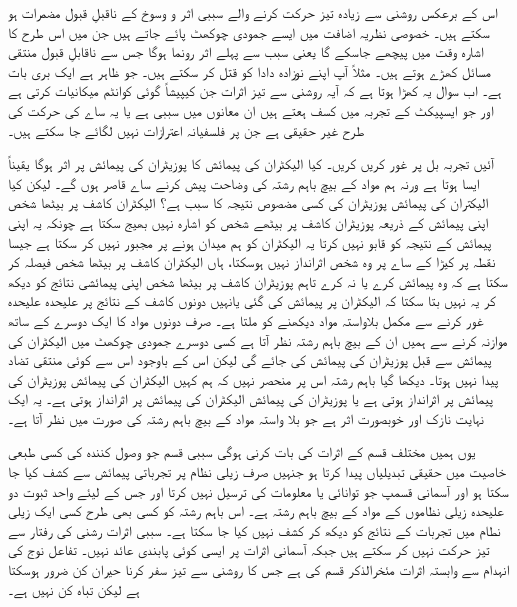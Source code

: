 
اس کے برعکس روشنی سے زیادہ تیز حرکت کرنے والے سببی اثر و وسوخ کے ناقبلِ قبول مضمرات ہو سکتے ہیں۔ خصوصی نظریہ اضافت میں ایسے جمودی چوکھٹ پائے جاتے ہیں جن میں اس طرح کا اشارہ وقت میں پیچھے جاسکے گا یعنی سبب سے پہلے اثر رونما ہوگا جس سے ناقابلِ قبول منتقی مسائل کھڑے ہوتے ہیں۔ مثلاً آپ اپنے نوزادہ دادا کو قتل کر سکتے ہیں۔ جو ظاہر ہے ایک بری بات ہے۔ اب سوال یہ کھڑا ہوتا ہے کہ آیہ روشنی سے تیز اثرات جن کیپیشاً گوئی کوانٹم میکانیات کرتی ہے اور جو ایسپیکٹ کے تجربہ میں کسف ہعتے ہیں ان معانوں میں سببی ہے یا یہ ساے کی حرکت کی طرح غیر حقیقی ہے جن پر فلسفیانہ اعترازات نہیں لگائے جا سکتے ہیں۔

آئیں تجربہ بل پر غور کریں کریں۔ کیا الیکٹران کی پیمائش کا پوزیٹران کی پیمائش پر اثر ہوگا  یقیناً ایسا ہوتا ہے ورنہ ہم مواد کے بیچ باہم رشتہ کی وضاحت پیش کرنے ساے قاصر ہوں گے۔ لیکن کیا الیکتران کی پیمائش پوزیٹران کی کسی مضصوص نتیجہ کا سبب ہے؟ الیکٹران کاشف پر بیٹھا شخص اپنی پیمائش کے ذریعہ پوزیٹران کاشف پر بیٹھے شخص کو اشارہ نہیں بھیج سکتا ہے چونکہ یہ اپنی پیمائش کے نتیجہ کو قابو نہیں کرتا یہ الیکٹران کو ہم میدان ہونے پر مجبور نہیں  کر سکتا ہے جیسا نقطہ  پر کیڑا کے ساے پر وہ شخص اثرانداز نہیں ہوسکتا، ہاں الیکٹران کاشف پر بیٹھا شخص فیصلہ کر سکتا ہے کہ وہ پیمائش کرے یا نہ کرے تاہم پوزیٹران کاشف پر بیٹھا شخص اپنی پیمائشی نتائج کو دیکھ کر یہ نہیں بتا سکتا کہ الیکٹران پر پیمائش کی گئی یانہیں دونوں کاشف کے نتائج پر علیحدہ علیحدہ غور کرنے سے مکمل بلاواستہ مواد دیکھنے کو ملتا ہے۔ صرف دونوں مواد کا ایک دوسرے کے ساتھ موازنہ کرنے سے ہمیں ان کے بیچ باہم رشتہ نظر آتا ہے کسی دوسرے جمودی چوکھٹ میں الیکٹران کی پیمائش سے قبل پوزیٹران کی پیمائش کی جائے گی لیکن اس کے باوجود اس سے کوئی منتقی تضاد پیدا نہیں ہوتا۔ دیکھا گیا باہم رشتہ اس پر منحصر نہیں کہ ہم کہیں الیکٹران کی پیمائش پوزیٹران کی پیمائش پر اثرانداز ہوتی ہے یا پوزیٹران کی پیمائش الیکٹران کی پیمائش پر اثرانداز ہوتی ہے۔ یہ ایک نہایت نازک اور خوبصورت اثر ہے جو بلا واستہ مواد کے بیچ باہم رشتہ کی صورت میں نظر آتا ہے۔

یوں ہمیں مختلف قسم کے اثرات کی بات کرنی ہوگی سببی قسم جو وصول کنندہ کی کسی طبعی خاصیت میں حقیقی تبدیلیاں پیدا کرتا ہو جنہیں صرف زیلی نظام پر تجرباتی پیمائش سے کشف کیا جا سکتا ہو اور آسمانی قسمپ جو توانائی یا معلومات کی ترسیل نہیں کرتا اور جس کے لیئے واحد ثبوت دو علیحدہ زیلی نظاموں کے مواد کے بیچ باہم رشتہ ہے۔ اس باہم رشتہ کو کسی بھی طرح کسی ایک زیلی نطام میں تجربات کے نتائج کو دیکھ کر کشف نہیں کیا جا سکتا ہے۔ سببی اثرات  رشنی کی رفتار سے تیز حرکت نہیں کر سکتے ہیں جبکہ آسمانی اثرات پر ایسی کوئی پابندی عائد نہیں۔ تفاعل نوج کی انہدام سے وابستہ اثرات مئخرالذکر قسم کی ہے جس کا روشنی سے تیز سفر کرنا حیران کن ضرور ہوسکتا ہے لیکن تباہ کن نہیں ہے۔

